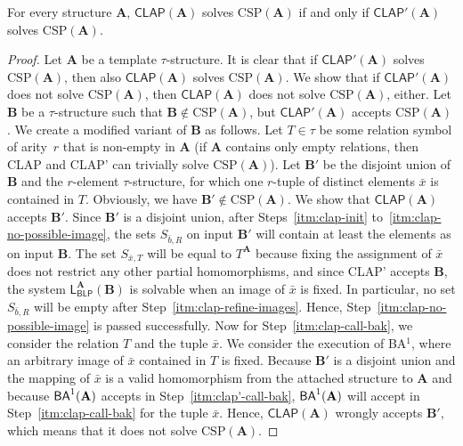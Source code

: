 \documentclass[a4paper,english, thm-restate]{lipics-v2021}
\newcommand{\tup}[1]{\bar{#1}}
\newcommand{\sig}{\tau}
\newcommand{\StructA}{\mathbf{A}}
\newcommand{\StructB}{\mathbf{B}}
\newcommand{\CSP}[1]{\mathrm{CSP}(#1)}
\newcommand{\leqs}{\mathsf{L}}
\newcommand{\blp}[2]{\leqs^#1_{\mathsf{BLP}} (#2)}
\newcommand{\CLAP}[1]{\mathsf{CLAP}(#1)}
\newcommand{\CLAPw}[1]{\mathsf{CLAP'}(#1)}
\begin{document}
	\begin{lemma}
		\label{lem:clap-iff-weak}
		For every structure $\StructA$,
		$\CLAP{\StructA}$ solves $\CSP{\StructA}$ if and only if $\CLAPw{\StructA}$ solves $\CSP{\StructA}$.
	\end{lemma}
	\begin{proof}
		Let $\StructA$ be a template $\sig$-structure.
		It is clear that if $\CLAPw{\StructA}$ solves  $\CSP{\StructA}$, then also $\CLAP{\StructA}$ solves  $\CSP{\StructA}$.
		We show that if $\CLAPw{\StructA}$ does not solve $\CSP{\StructA}$, then $\CLAP{\StructA}$ does not solve $\CSP{\StructA}$, either.
		Let $\StructB$ be a $\sig$-structure such that $\StructB \notin \CSP{\StructA}$, but $\CLAPw{\StructA}$ accepts $\CSP{\StructA}$.
		We create a modified variant of $\StructB$ as follows.
		Let $T \in \sig$ be some relation symbol of arity~$r$
		that is non-empty in $\StructA$ (if $\StructA$ contains only empty relations, then CLAP and CLAP' can trivially solve $\CSP{\StructA}$).
		Let $\StructB'$ be the disjoint union of $\StructB$
		and the $r$\nobreakdash-element $\sig$-structure, for which one $r$-tuple of distinct elements $\tup{x}$ is contained in $T$.
		Obviously, we have $\StructB' \notin \CSP{\StructA}$.
		We show that $\CLAP{\StructA}$ accepts $\StructB'$.
		Since $\StructB'$ is a disjoint union,
		after Steps~\ref{itm:clap-init} to~\ref{itm:clap-no-possible-image}, the sets $S_{\tup{b},R}$ on input $\StructB'$ will contain at least the elements as on input $\StructB$.
		The set $S_{\tup{x},T}$ will be equal to $T^\StructA$
		because fixing the assignment of $\tup{x}$ does not restrict any other partial homomorphisms,
		and since CLAP' accepts $\StructB$, the system $\blp{\StructA}{\StructB}$ is solvable
		when an image of $\tup{x}$ is fixed.
		In particular, no set  $S_{\tup{b},R}$ will be empty after Step~\ref{itm:clap-refine-images}.
		Hence, Step~\ref{itm:clap-no-possible-image} is passed successfully.
		Now for Step~\ref{itm:clap-call-bak}, we consider the relation $T$ and the tuple $\tup{x}$.
		We consider the execution of BA$^1$, where an arbitrary image of $\tup{x}$ contained in $T$ is fixed.
		Because $\StructB'$ is a disjoint union and the mapping of $\tup{x}$ is a valid homomorphism from the attached structure to $\StructA$
		and because $\BAk{1}{\StructA}$ accepts in Step~\ref{itm:clap'-call-bak},
		$\BAk{1}{\StructA}$ will accept in Step~\ref{itm:clap-call-bak} for the tuple $\tup{x}$.
		Hence, $\CLAP{\StructA}$ wrongly accepts $\StructB'$, which means that it does not solve $\CSP{\StructA}$.
	\end{proof}
	
\end{document}
